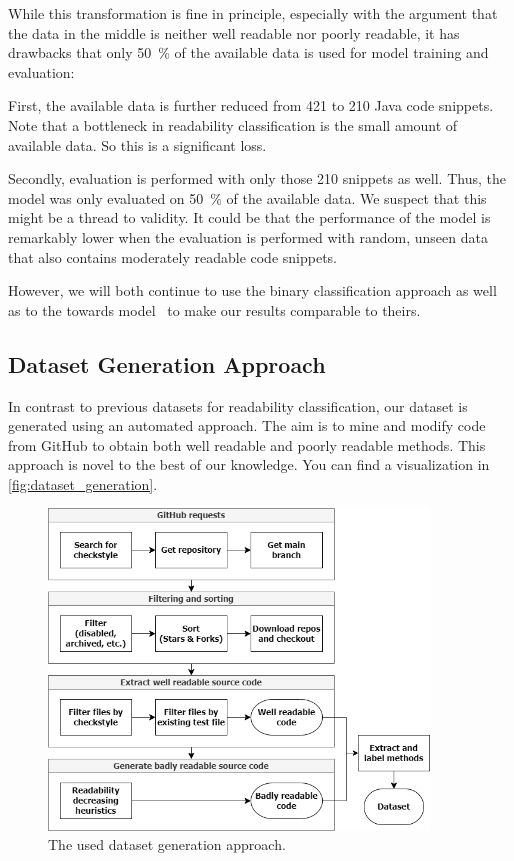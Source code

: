 \documentclass[%
class=scrreprt,
chapterprefix=false,%
open=right,%
twoside=false,%
paper=a4,%
logofile={Logo\_zentral\_farbig\_EN.png},%
thesistype=master,%
UKenglish,%
]{se2thesis}
\theoremstyle{definition}
\begin{document}
	While this transformation is fine in principle, especially with the argument that the data in the middle is neither well readable nor poorly readable, it has drawbacks that only 50~\% of the available data is used for model training and evaluation:
	
	First, the available data is further reduced from 421 to 210 Java code snippets. Note that a bottleneck in readability classification is the small amount of available data. So this is a significant loss.
	
	Secondly, evaluation is performed with only those 210 snippets as well. Thus, the model was only evaluated on 50~\% of the available data. We suspect that this might be a thread to validity. It could be that the performance of the model is remarkably lower when the evaluation is performed with random, unseen data that also contains moderately readable code snippets.
	
	However, we will both continue to use the binary classification approach as well as to the towards model~\cite{mi2022towards} to make our results comparable to theirs.
	
\subsection{Dataset Generation Approach} \label{Dataset Generation Approach}
	In contrast to previous datasets for readability classification, our dataset is generated using an automated approach. The aim is to mine and modify code from GitHub to obtain both well readable and poorly readable methods. This approach is novel to the best of our knowledge. You can find a visualization in \autoref{fig:dataset_generation}.
	
	\begin{figure}[tb]
		\centering
		\includegraphics[width=0.9\textwidth]{img/dataset_generation.png}
		\caption{The used dataset generation approach.} %
		\label{fig:dataset_generation}
	\end{figure}
	
\end{document}
